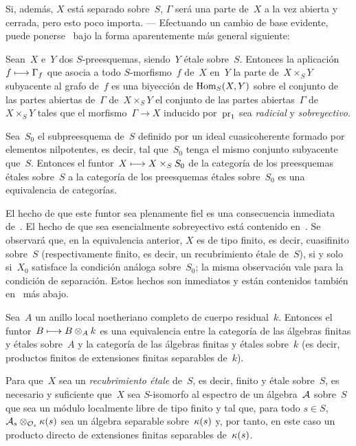 Si, además, $X$ está separado sobre~$S$, $\Gamma$ será una parte de~$X$ a la
vez abierta y cerrada, pero esto poco importa. --- Efectuando un cambio de
base evidente, puede ponerse~ bajo la forma aparentemente más
general siguiente:
\begin{corollaire}
\label{IX.1.6}
Sean~$X$ e~$Y$ dos $S$-preesquemas, siendo~$Y$ étale sobre~$S$. Entonces la
aplicación~$f\mto\Gamma_f$ que asocia a todo $S$-morfismo~$f$ de~$X$ en~$Y$
la parte de~$X\times_S Y$ subyacente al grafo de~$f$ es una biyección de
$\Hom_S(X,Y)$ sobre
{el conjunto de las partes abiertas de~$\Gamma$ de~$X\times_S Y$}
{el conjunto de las partes abiertas~$\Gamma$ de~$X\times_S Y$}
tales que el morfismo~$\Gamma\to X$ inducido por~$\pr_1$ sea
\emph{radicial} y \emph{sobreyectivo}.
\end{corollaire}

\begin{proposition}
\label{IX.1.7}
Sea~$S_0$ el subpreesquema de~$S$ definido por un ideal cuasicoherente
formado por elementos nilpotentes, es decir, tal que~$S_0$ tenga el mismo
conjunto subyacente que~$S$. Entonces el funtor~$X\mto X\times_S S_0$ de
la categoría de los preesquemas étales sobre~$S$ a la categoría de los
preesquemas étales sobre~$S_0$ es una equivalencia de categorías.
\end{proposition}

El hecho de que este funtor sea plenamente fiel es una consecuencia
inmediata de~. El hecho de que sea esencialmente sobreyectivo
está contenido en~. Se observará que, en la equivalencia
anterior, $X$ es de tipo finito, es decir, cuasifinito sobre~$S$
(respectivamente finito, es decir, un recubrimiento étale de~$S$), si y
solo si~$X_0$ satisface la condición análoga sobre~$S_0$; la misma
observación vale para la condición de separación. Estos hechos son
inmediatos y están contenidos también en~ más abajo.

\begin{corollaire}
\label{IX.1.8}
Sea~$A$ un anillo local noetheriano completo de cuerpo residual~$k$.
Entonces el funtor~$B\mto B\otimes_A k$ es una equivalencia entre la
categoría de las álgebras finitas y étales sobre~$A$ y la categoría de las
álgebras finitas y étales sobre~$k$ (es decir, productos finitos de
extensiones finitas separables de~$k$).
\end{corollaire}

\begin{proposition}
\label{IX.1.9}
Para que~$X$ sea un \emph{recubrimiento étale} de~$S$, es decir, finito y
étale sobre~$S$, es necesario y suficiente que~$X$ sea $S$-isomorfo al
espectro de un álgebra~$\cal{A}$ sobre~$S$ que sea un módulo localmente
libre de tipo finito y tal que, para todo
$s\in S$, $\cal{A}_s\otimes_{\cal{O}_s}\kres(s)$ sea un álgebra separable
sobre~$\kres(s)$ y, por tanto, en este caso un producto directo de
extensiones finitas separables de~$\kres(s)$.
\end{proposition}

